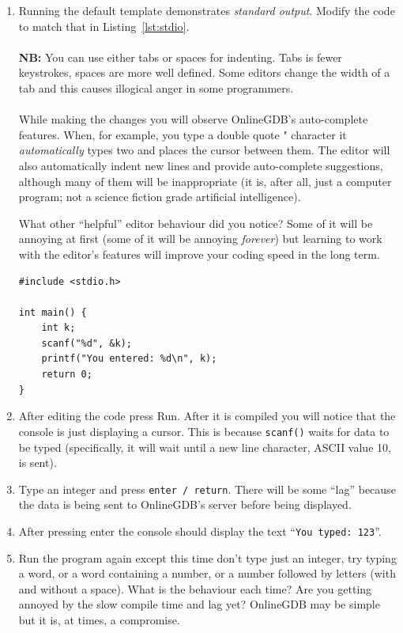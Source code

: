 \documentclass{lab}
\begin{document}
\begin{task}{}{}

\begin{enumerate}

\item Running the default template demonstrates \textit{standard output}. Modify the code to match that in Listing~\ref{lst:stdio}.
\\ \\
\textbf{NB:} You can use either tabs or spaces for indenting. Tabs is fewer keystrokes, spaces are more well defined. Some editors change the width of a tab and this causes illogical anger in some programmers.
\\ \\
While making the changes you will observe OnlineGDB's auto-complete features. When, for example, you type a double quote " character it \textit{automatically} types two and places the cursor between them. The editor will also automatically indent new lines and provide auto-complete suggestions, although many of them will be inappropriate (it is, after all, just a computer program; not a science fiction grade artificial intelligence).

What other ``helpful'' editor behaviour did you notice? Some of it will be annoying at first (some of it will be annoying \textit{forever}) but learning to work with the editor's features will improve your coding speed in the long term.

\begin{lstlisting}[style=CStyle,caption=A basic C program which demonstrates input and output.,label=lst:stdio]
#include <stdio.h>

int main() {
	int k;
	scanf("%d", &k);
	printf("You entered: %d\n", k);
	return 0;
}
\end{lstlisting}

\item After editing the code press Run. After it is compiled you will notice that the console is just displaying a cursor. This is because \texttt{scanf()} waits for data to be typed (specifically, it will wait until a new line character, ASCII value 10, is sent).

\item Type an integer and press \texttt{enter / return}. There will be some ``lag'' because the data is being sent to OnlineGDB's server before being displayed.

\item After pressing enter the console should display the text ``\texttt{You typed: 123}''.

\item Run the program again except this time don't type just an integer, try typing a word, or a word containing a number, or a number followed by letters (with and without a space). What is the behaviour each time? Are you getting annoyed by the slow compile time and lag yet? OnlineGDB may be simple but it is, at times, a compromise.

\end{enumerate}
\end{task}\label{tsk:stdio}
\end{document}
